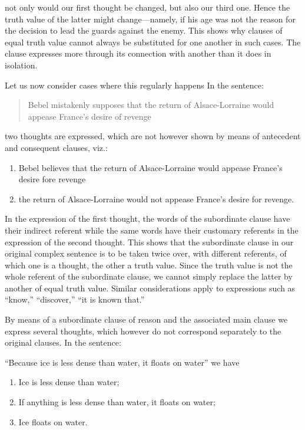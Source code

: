 \documentclass[twoside,12pt,a4paper]{article}
\begin{document}
\noindent not only would our first thought be changed, but also our
third one. Hence the truth value of the latter might change---namely, if
his age was not the reason for the decision to lead the guards against
the enemy. This shows why clauses of equal truth value cannot always
be substituted for one another in such cases. The clause expresses
more through its connection with another than it does in isolation.

Let us now consider cases where this regularly happens In the
sentence:

\begin{quote}
  Bebel mistakenly supposes that the return of Alsace-Lorraine would
  appease France's desire of revenge
\end{quote}

two thoughts are expressed, which are not however shown by means of
antecedent and consequent clauses, viz.:

\begin{enumerate}[label={(\arabic*)}]
\item Bebel believes that the return of Alsace-Lorraine would appease
  France's desire fore revenge
\item {} the return of Alsace-Lorraine would not appease France's desire
  for revenge.
\end{enumerate}

In the expression of the first thought, the words of the subordinate
clause have their indirect referent while the same words have their
customary referents in the expression of the second thought. This
shows that the subordinate clause in our original complex sentence is
to be taken twice over, with different referents, of which one is a
thought, the other a truth value. Since the truth value is not the
whole referent of the subordinate clause, we cannot simply replace the
latter by another of equal truth value. Similar considerations apply
to expressions such as ``know,'' ``discover,'' ``it is known that.''

By means of a subordinate clause of reason and the associated main
clause we express several thoughts, which however do not correspond
separately to the original clauses. In the sentence:

``Because ice is less dense than water, it floats on water'' we have

\begin{enumerate}[label={(\arabic*)}]
\item Ice is less dense than water;
\item If anything is less dense than water, it floats on water;
\item Ice floats on water.
\end{enumerate}
\end{document}

